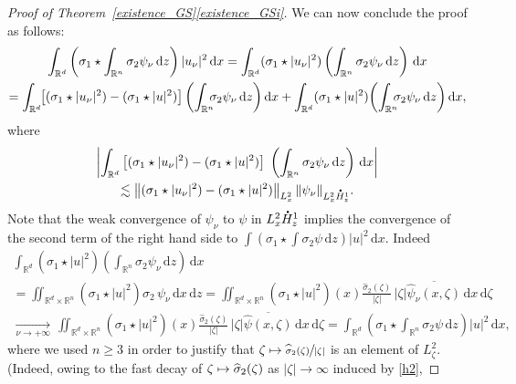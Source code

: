 \documentclass[10pt]{amsart}
\newcommand\mto{\mathchoice{\longmapsto}{\mapsto}{\mapsto}{\mapsto}}
\theoremstyle{definition}
\newcommand*{\overbigdot}[1]{%
\accentset{\mbox{\large\bfseries .}}{#1}}
\newenvironment{ProofOf}[1]{\begin{proof}[Proof of #1]}{\end{proof}}
\newcommand{\R}{\mathbb{R}}
\newcommand{\ud}{\, {\mathrm{d}}}
\begin{document}
\begin{ProofOf}{Theorem~\ref{existence_GS}\eqref{existence_GSi}}
We can now conclude the proof as follows:
\bgroup
{}
\begin{multline*}
\int_{\R^{d}}\left(\sigma_{1}\star\int_{\R^{n}}\sigma_{2}\psi_{\nu}\ud z\right)|u_{\nu}|^{2}\ud x=\int_{\R^{d}}(\sigma_{1}\star|u_{\nu}|^{2})\left(\int_{\R^{n}}\sigma_{2}\psi_{\nu}\ud z\right)\ud x\\
=\int_{\R^{d}}\hspace*{-1mm}\left[(\sigma_{1}\star|u_{\nu}|^{2})-(\sigma_{1}\star|u|^{2})\right]\biggl(\int_{\R^{n}}\hspace*{-2mm}\sigma_{2}\psi_{\nu}\ud z\biggr)\ud x+\int_{\R^{d}}(\sigma_{1}\star|u|^{2})\biggl(\int_{\R^{n}}\hspace*{-2mm}\sigma_{2}\psi_{\nu}\ud z\biggr)\ud x,
\end{multline*}
\egroup
where
\begin{multline*}
\left|\int_{\R^{d}}\left[(\sigma_{1}\star|u_{\nu}|^{2})-(\sigma_{1}\star|u|^{2})\right]\;\left(\int_{\R^{n}}\sigma_{2}\psi_{\nu}\ud z\right)\ud x\right|\\
\lesssim\left\|(\sigma_{1}\star|u_{\nu}|^{2})-(\sigma_{1}\star|u|^{2})\right\|_{L_{x}^{2}}\|\psi_{\nu}\|_{L_{x}^{2}\overbigdot{H}_{z}^{1}}.
\end{multline*}
Note that the weak convergence of $\psi_{\nu}$ to $\psi$ in $L_{x}^{2}\overbigdot{H}_{z}^{1}$ implies the convergence of the second term of the right hand side to $\int(\sigma_{1}\star\int\sigma_{2}\psi\ud z)|u|^{2}\ud x$. Indeed
\bgroup
{}
\begin{multline*}
\int_{\R^{d}}(\sigma_{1}\star|u|^{2})\left(\int_{\R^{n}}\sigma_{2}\psi_{\nu}\ud z\right)\ud x\\
=\iint_{\R^{d}\times\R^{n}}(\sigma_{1}\star|u|^{2})\sigma_{2}\,\psi_{\nu}\ud x\ud z
=\iint_{\R^{d}\times\R^{n}} (\sigma_{1}
\star|u|^{2})(x)\frac{\widehat{\sigma}_{2}(\zeta)}{ |\zeta|} \,|\zeta|\overline{\widehat{\psi}_{\nu}(x,\zeta)}\ud x\ud \zeta\\
\underset{\nu\to +\infty}{\to}\,\iint_{\R^{d}\times\R^{n}}
(\sigma_{1}\star|u|^{2})(x)\frac{\widehat{\sigma}_{2}(\zeta)}{ |\zeta|}\, |\zeta|\overline{\widehat{\psi}(x,\zeta)}\ud x\ud\zeta
=\int_{\R^{d}}\left(\sigma_{1}\star\int_{\R^{n}}\sigma_{2}\psi\ud z\right)|u|^{2}\ud x,
\end{multline*}
\egroup
where we used $n\geq 3$ in order to justify that $\zeta\mto\sfrac{\widehat{\sigma}_{2}(\zeta)}{|\zeta|}$ is an element of $L_{\zeta}^{2}$.
(Indeed, owing to the fast decay of $\zeta\mto \widehat{\sigma}_{2}(\zeta)$ as $|\zeta|\to \infty$ induced by \eqref{h2},

\end{ProofOf}
\end{document}
